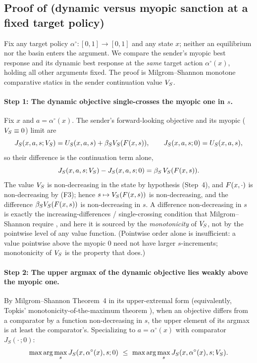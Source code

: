 \subsection{Proof of  (dynamic versus myopic sanction at a fixed target policy)}
\label{app:proof-dominance}

Fix any target policy $\alpha^{\circ}\colon[0,1]\to[0,1]$ and any
state $x$; neither an equilibrium nor the basin enters the argument. We
compare the sender's myopic best response and
its dynamic best response at the \emph{same} target
action $\alpha^{\circ}(x)$, holding all other arguments fixed. The
proof is Milgrom--Shannon monotone comparative statics in the sender
continuation value $V_S$.

\paragraph{Step 1: The dynamic objective single-crosses the myopic one in $s$.}
Fix $x$ and $a=\alpha^{\circ}(x)$. The sender's forward-looking
objective and its myopic ($V_S\equiv0$) limit are
\[
J_S(x,a,s;V_S)=U_S(x,a,s)+\beta_SV_S(F(x,s)),
\qquad
J_S(x,a,s;0)=U_S(x,a,s),
\]
so their difference is the continuation term alone,
\[
J_S(x,a,s;V_S)-J_S(x,a,s;0)=\beta_S\,V_S(F(x,s)).
\]
The value $V_S$ is non-decreasing in the state by hypothesis (Step~4),
and $F(x,\cdot)$ is non-decreasing by \textup{(F3)};
hence $s\mapsto V_S(F(x,s))$ is non-decreasing, and the difference
$\beta_SV_S(F(x,s))$ is non-decreasing in $s$. A difference non-decreasing in
$s$ is exactly the increasing-differences / single-crossing condition that
Milgrom--Shannon require \citep{MilgromShannon1994}, and here it is sourced
by the \emph{monotonicity} of $V_S$, not by the pointwise level of any value
function. (Pointwise order alone is insufficient: a value pointwise above the
myopic $0$ need not have larger $s$-increments; monotonicity of $V_S$ is the
property that does.)

\paragraph{Step 2: The upper argmax of the dynamic objective lies weakly above the myopic one.}
By Milgrom--Shannon Theorem~4 in its upper-extremal form (equivalently,
Topkis' monotonicity-of-the-maximum theorem \citep{topkis1998}), when an
objective differs from a comparator by a function non-decreasing in $s$, the
upper element of its argmax is at least the comparator's. Specializing to
$a=\alpha^{\circ}(x)$ with comparator $J_S(\cdot\,;0)$:
\[
\max\arg\max_s J_S(x,\alpha^{\circ}(x),s;0)
\ \le\ \max\arg\max_s J_S(x,\alpha^{\circ}(x),s;V_S).
\]

